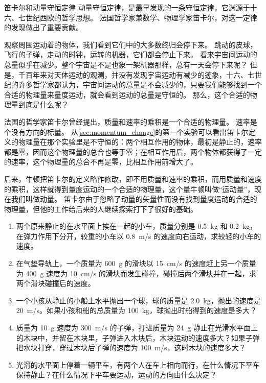 \begin{Reading}{笛卡尔和动量守恒定律}
动量守恒定律，是最早发现的一条守恒定律，它渊源于十六、七世纪西欧的哲学思想。
法国哲学家兼数学、物理学家笛卡尔，对这一定律的发现做出了重要贡献。

观察周围运动着的物体，我们看到它们中的大多数终归会停下来。
跳动的皮球，飞行的子弹，走动的时钟，运转的机器，它们都会停止下来。
看来宇宙间运动的总量似乎在减少。整个宇宙是不是也象一架机器那样，总有一天会停下来呢？
但是，千百年来对天体运动的观测，并没有发现宇宙运动有减少的迹象，十六、七世纪的许多哲学家都认为，宇宙间运动的总量是不会减少的，只要我们能够找到一个合适的物理量来量度运动，就会看到运动的总量是守恒的。
那么，这个合适的物理量到底是什么呢？

法国的哲学家笛卡尔曾经提出，质量和速率的乘积是一个合适的物理量。
速率是个没有方向的标量。
从\cref{sec:momentum_change}的第一个实验可以看出笛卡尔定义的物理量在那个实验里是不守恒的：两个相互作用的物体，最初是静止的，速率都是零，因而这个物理量的总合也等于零；在相互作用后，两个物体都获得了一定的速率，这个物理量的总合不再是零，比相互作用前增大了。

后来，牛顿把笛卡尔的定义略作修改，即不用质量和速率的乘积，而用质量和速度的乘积，这样就得到量度运动的一个合适的物理量，这个量牛顿叫做“运动量”，现在我们叫做动量。
笛卡尔由于忽略了动量的矢量性而没有找到量度运动的合适的物理量，但他的工作给后来的人继续探索打下了很好的基础。
\end{Reading}

\begin{Practice}
\begin{enumerate}
  \item 两个原来静止的在水平面上挨在一起的小车，质量分别是 \qty{0.5}{kg} 和 \qty{0.2}{kg}，在弹力作用下分开，较重的小车以 \qty{0.8}{m/s} 的速度向右运动，求较轻的小车的速度。
  \item 在气垫导轨上，一个质量为 \qty{600}{g} 的滑块以 \qty{15}{cm/s} 的速度赶上另一个质量为 \qty{400}{g} 速度为 \qty{10}{cm/s} 的滑块而发生碰撞，碰撞后两个滑块并在一起，求两个滑块碰撞后的速度。
  \item 一个小孩从静止的小船上水平抛出一个球，球的质量是 \qty{2.0}{kg}，抛出的速度是 \qty{20}{m/s}。如果小孩和船的总质量为 \qty{100}{kg}，球抛出时船得到的速度是多大？
  \item 质量为 \qty{10}{g} 速度为 \qty{300}{m/s} 的子弹，打进质量为 \qty{24}{g} 静止在光滑水平面上的木块中，并留在木块里，子弹进入木块后，木块运动的速度多大？如果子弹把水块打穿，穿过木块后子弹的速度为 \qty{100}{m/s}，这时木块的速度多大？
  \item 光滑的水平面上停着一辆平车，有两个人在车上相向而行，在什么情况下平车保持静止？在什么情况下平车要运动，运动的方向由什么决定？
\end{enumerate}
\end{Practice}

